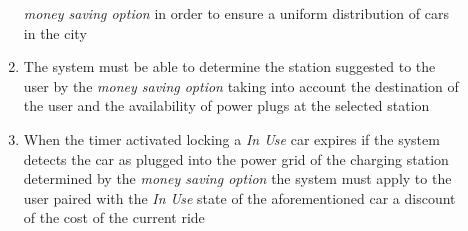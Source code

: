 \begin{description}
\begin{enumerate}[resume*]
  				\emph{money saving option} in order to ensure a uniform distribution of cars in the
  				city
  				\item The system must be able to determine the station suggested to the user by the
  				\emph{money saving option} taking into account the destination of the user and
  				the availability of power plugs at the selected station
  				\item When the timer activated locking a \emph{In Use} car expires if the system
  				detects the car as plugged into the power grid of the charging station determined by
  				the \emph{money saving option} the system must apply to the user paired with the
  				\emph{In Use} state of the aforementioned car a discount of the cost of
  				the current ride		
   			\end{enumerate}
  	\end{description}

